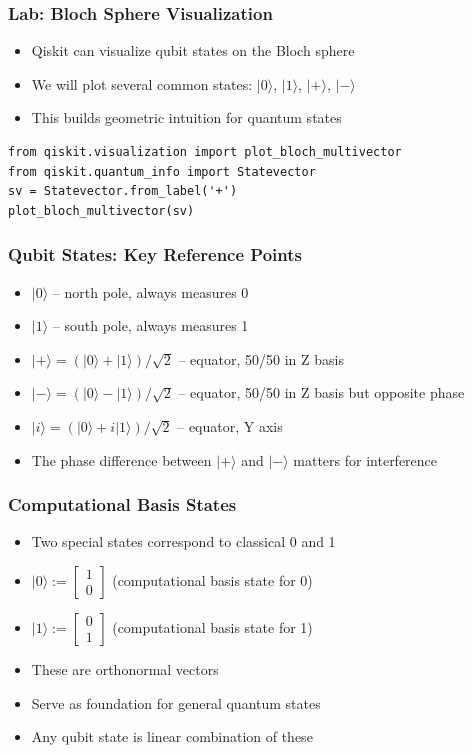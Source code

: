 \begin{frame}[fragile]\frametitle{Lab: Bloch Sphere Visualization}
\begin{itemize}
\item Qiskit can visualize qubit states on the Bloch sphere
\item We will plot several common states: $|0\rangle$, $|1\rangle$, $|+\rangle$, $|-\rangle$
\item This builds geometric intuition for quantum states
\end{itemize}
\begin{verbatim}
from qiskit.visualization import plot_bloch_multivector
from qiskit.quantum_info import Statevector
sv = Statevector.from_label('+')
plot_bloch_multivector(sv)
\end{verbatim}
\end{frame}

\begin{frame}[fragile]\frametitle{Qubit States: Key Reference Points}
\begin{itemize}
\item $|0\rangle$ -- north pole, always measures 0
\item $|1\rangle$ -- south pole, always measures 1
\item $|+\rangle = (|0\rangle + |1\rangle)/\sqrt{2}$ -- equator, 50/50 in Z basis
\item $|-\rangle = (|0\rangle - |1\rangle)/\sqrt{2}$ -- equator, 50/50 in Z basis but opposite phase
\item $|i\rangle = (|0\rangle + i|1\rangle)/\sqrt{2}$ -- equator, Y axis
\item The phase difference between $|+\rangle$ and $|-\rangle$ matters for interference
\end{itemize}
\end{frame}

\begin{frame}[fragile]\frametitle{Computational Basis States}
\begin{itemize}
\item Two special states correspond to classical 0 and 1
\item $|0\rangle := \begin{bmatrix} 1 \\ 0 \end{bmatrix}$ (computational basis state for 0)
\item $|1\rangle := \begin{bmatrix} 0 \\ 1 \end{bmatrix}$ (computational basis state for 1)
\item These are orthonormal vectors
\item Serve as foundation for general quantum states
\item Any qubit state is linear combination of these
\end{itemize}
\end{frame}

